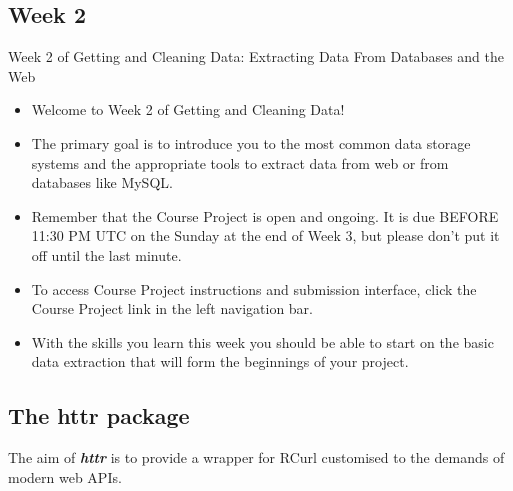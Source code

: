 \documentclass[12pt]{article}
\begin{document}
\newpage
\subsection*{Week 2} 
Week 2 of Getting and Cleaning Data: Extracting Data From Databases and the Web

\begin{itemize}
\item Welcome to Week 2 of Getting and Cleaning Data! 

\item The primary goal is to introduce you to the most common data storage systems and the appropriate tools to extract data from web or from databases like MySQL. 

\item Remember that the Course Project is open and ongoing. It is due BEFORE 11:30 PM UTC on the Sunday at the end of Week 3, but please don't put it off until the last minute. 
\item To access Course Project instructions and submission interface, click the Course Project link in the left navigation bar.  


\item With the skills you learn this week you should be able to start on the basic data extraction that will form the beginnings of your project.
\end{itemize} 
\newpage
\subsection*{The httr package}
The aim of \textbf{\textit{httr}} is to provide a wrapper for RCurl customised to the demands of modern web APIs.
\end{document}
